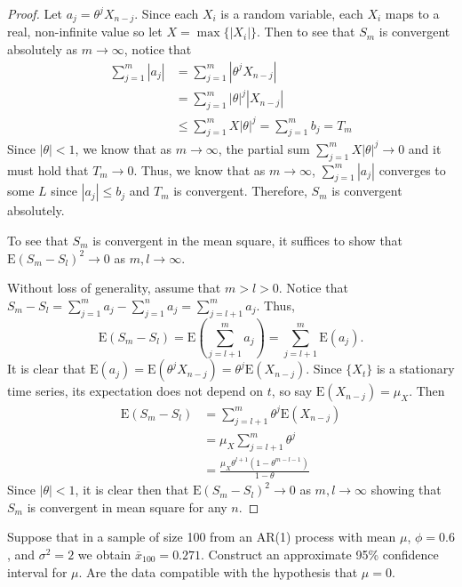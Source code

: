 \documentclass[12pt]{article}
\theoremstyle{definition}
\newenvironment{custompbm}[1]
  {\renewcommand\theproblem{#1}\problem}
  {\endproblem}
\newcommand{\E}{\text{E}}
\begin{document}
\begin{proof}
  Let $a_j = \theta ^ j X_{n-j}$. Since each $X_i$ is a random variable, each $X_i$
  maps to a real, non-infinite value so let $X = \max\{|X_i|\}$. Then to see that $S_m$ is convergent absolutely
  as $m \to \infty$, notice that
  \begin{align*}
    \sum_{j=1}^{m} |a_j|
    &= \sum_{j=1}^{m} |\theta ^ j X_{n-j}| \\
    &= \sum_{j=1}^{m} |\theta| ^ j |X_{n-j}|\\
    &\leq \sum_{j=1}^{m} X|\theta| ^ j = \sum_{j=1}^{m} b_j = T_m
  \end{align*}
  Since $|\theta|<1$, we know that as $m \to \infty$, the partial sum $\sum_{j=1}^m X|\theta|^j \to 0$
  and it must hold that $T_m \to 0$. Thus, we know that as $m \to \infty$, $\sum_{j=1}^{m} |a_j|$ converges to some $L$ since $|a_j| \leq b_j$
  and $T_m$ is convergent. Therefore, $S_m$ is convergent absolutely.

  To see that $S_m$ is convergent in the mean square, it suffices to show that
  $\E(S_m - S_l)^2 \to 0$ as $m, l \to \infty$.

  Without loss of generality, assume that $m > l > 0$. Notice that
  $S_m - S_l = \sum_{j=1}^m a_j - \sum_{j=1}^n a_j = \sum_{j=l+1}^{m} a_j$.
  Thus, $$\E(S_m - S_l) = \E\left(\sum_{j=l+1}^{m} a_j\right) = \sum_{j=l+1}^m \E(a_j).$$
  It is clear that $\E(a_j) = \E(\theta^j X_{n-j}) = \theta^j \E(X_{n-j})$. Since
  $\{X_t\}$ is a stationary time series, its expectation does not depend on $t$,
  so say $\E(X_{n-j}) = \mu_X$. Then
  \begin{align*}
    \E(S_m - S_l)
    &= \sum_{j=l+1}^m \theta^j\E(X_{n-j}) \\
    &=\mu_X \sum_{j=l+1}^m \theta^j \\
    &= \frac{\mu_X\theta^{l+1}(1-\theta^{m-l-1})}{1-\theta}
  \end{align*}
  Since $|\theta| < 1$, it is clear then that $\E(S_m - S_l)^2 \to 0$ as $m,l \to \infty$
  showing that $S_m$ is convergent in mean square for any $n$.
\end{proof}


\begin{custompbm}{2.11}
  Suppose that in a sample of size 100 from an AR(1) process with mean $\mu$,
  $\phi=0.6$, and $\sigma^2 = 2$ we obtain $\bar{x}_{100} = 0.271$.
  Construct an approximate 95\% confidence interval for $\mu$. Are the data
  compatible with the hypothesis that $\mu = 0$.
\end{custompbm}
\end{document}

